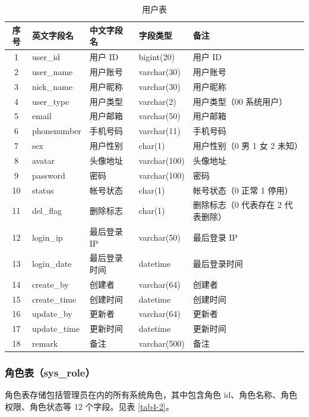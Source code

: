 \documentclass{izdthesis}
\begin{document}
\begin{table}[H]
  \centering
  \caption{用户表}
  \label{tab4-1}
  \songti
  \begin{tabular}{c l l l p{4.5cm}}
    \toprule
    序号 & 英文字段名 & 中文字段名 & 字段类型 & 备注 \\
    \midrule
    1 & user\_id & 用户 ID & bigint(20) & 用户 ID \\
    2 & user\_name & 用户账号 & varchar(30) & 用户账号 \\
    3 & nick\_name & 用户昵称 & varchar(30) & 用户昵称 \\
    4 & user\_type & 用户类型 & varchar(2) & 用户类型（00 系统用户） \\
    5 & email & 用户邮箱 & varchar(50) & 用户邮箱 \\
    6 & phonenumber & 手机号码 & varchar(11) & 手机号码 \\
    7 & sex & 用户性别 & char(1) & 用户性别（0 男 1 女 2 未知） \\
    8 & avatar & 头像地址 & varchar(100) & 头像地址 \\
    9 & password & 密码 & varchar(100) & 密码 \\
    10 & status & 帐号状态 & char(1) & 帐号状态（0 正常 1 停用） \\
    11 & del\_flag & 删除标志 & char(1) & 删除标志（0 代表存在 2 代表删除） \\
    12 & login\_ip & 最后登录 IP & varchar(50) & 最后登录 IP \\
    13 & login\_date & 最后登录时间 & datetime & 最后登录时间 \\
    14 & create\_by & 创建者 & varchar(64) & 创建者 \\
    15 & create\_time & 创建时间 & datetime & 创建时间 \\
    16 & update\_by & 更新者 & varchar(64) & 更新者 \\
    17 & update\_time & 更新时间 & datetime & 更新时间 \\
    18 & remark & 备注 & varchar(500) & 备注 \\
    \bottomrule
  \end{tabular}
\end{table}

\subsubsection{角色表（sys\_role）}
角色表存储包括管理员在内的所有系统角色，其中包含角色 id、角色名称、角色权限、角色状态等 12 个字段。见表 \ref{tab4-2}。
\end{document}
